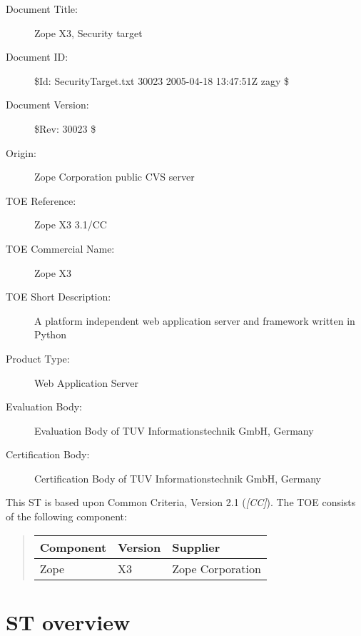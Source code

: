 \documentclass[10pt,a4paper,english]{scrbook}
\begin{document}
\begin{description}
\item [Document Title:]
Zope X3, Security target


\item [Document ID:]
{\$}Id: SecurityTarget.txt 30023 2005-04-18 13:47:51Z zagy {\$}


\item [Document Version:]
{\$}Rev: 30023 {\$}


\item [Origin:]
Zope Corporation public CVS server


\item [TOE Reference:]
Zope X3 3.1/CC


\item [TOE Commercial Name:]
Zope X3


\item [TOE Short Description:]
A platform independent web application server and framework written in Python


\item [Product Type:]
Web Application Server


\item [Evaluation Body:]
Evaluation Body of TUV Informationstechnik GmbH, Germany


\item [Certification Body:]
Certification Body of TUV Informationstechnik GmbH, Germany


\end{description}

This ST is based upon Common Criteria, Version 2.1 (\emph{{[}CC]}).
The TOE consists of the following component:
\begin{quote}

\begin{longtable}[c]{|l|l|l|}
\hline
\textbf{
Component
} & \textbf{
Version
} & \textbf{
Supplier
} \\
\hline
\endhead

Zope
 & 
X3
 & 
Zope Corporation
 \\
\hline
\end{longtable}
\end{quote}



\hypertarget{st-overview}{}
\section{ST overview}
\end{document}
